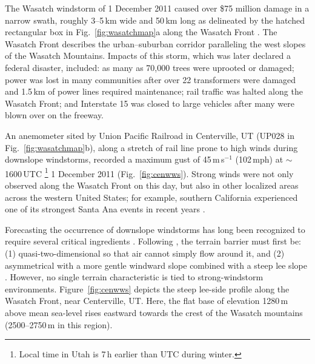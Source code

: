 \documentclass[pdftex,12pt]{article}
\def\mps{m\,s$^{-1}$}
\def\around{$\sim$}
\begin{document}
The Wasatch windstorm of 1 December 2011 caused over \$75 million damage in a narrow swath, roughly 3--5\,km wide and 50\,km long as delineated by the hatched rectangular box in Fig.~\ref{fig:wasatchmap}a along the Wasatch Front \citep{O'Donoghue2012}. The Wasatch Front describes the urban--suburban corridor paralleling the west slopes of the Wasatch Mountains.   Impacts of this storm, which was later declared a federal disaster, included: as many as 70,000 trees were uprooted or damaged; power was lost in many communities after over 22 transformers were damaged and 1.5\,km of power lines required maintenance; rail traffic was halted along the Wasatch Front; and Interstate 15 was closed to large vehicles after many were blown over on the freeway.

An anemometer sited by Union Pacific Railroad in Centerville, UT (UP028 in Fig.~\ref{fig:wasatchmap}b), along a stretch of rail line prone to high winds during downslope windstorms, recorded a maximum gust of 45\,\mps{} (102\,mph) at \around 1600\,UTC \footnote{Local time in Utah is 7\,h earlier than UTC during winter.} 1 December 2011 (Fig.~\ref{fig:cenwws}). Strong winds were not only observed along the Wasatch Front on this day, but also in other localized areas across the western United States; for example, southern California experienced one of its strongest Santa Ana events in recent years \citep{Welch2011}.

Forecasting the occurrence of downslope windstorms has long been recognized to require several critical ingredients \citep{Smith1985,Markowski2010}. Following \citet{Markowski2010}, the terrain barrier must first be: (1) quasi-two-dimensional so that air cannot simply flow around it, and (2) asymmetrical with a more gentle windward slope combined with a steep lee slope \citep{Miller1991-tf}. However, no single terrain characteristic is tied to strong-windstorm environments. Figure~\ref{fig:cenwws} depicts the steep lee-side profile along the Wasatch Front, near Centerville, UT. Here, the flat base of elevation 1280\,m above mean sea-level rises eastward towards the crest of the Wasatch mountains (2500--2750\,m in this region).

\end{document}
